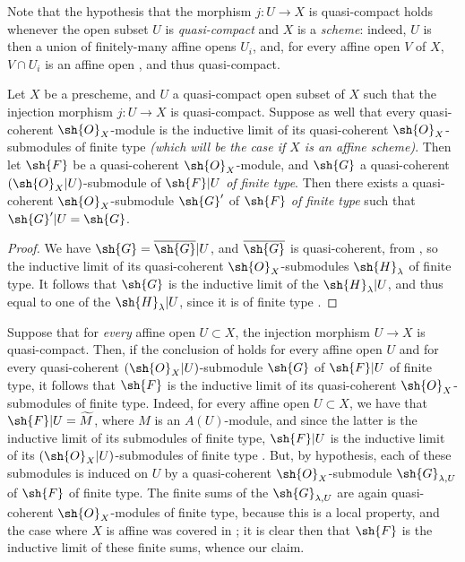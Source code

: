 Note that the hypothesis that the morphism $j:U\to X$ is quasi-compact
holds whenever the open subset $U$ is \emph{quasi-compact} and $X$ is a
\emph{scheme}: indeed, $U$ is then a union of finitely-many affine opens $U_i$,
and, for every affine open $V$ of $X$, $V\cap U_i$ is an affine open , and
thus quasi-compact.

\begin{corollary}[9.4.3]
\label{I.9.4.3}
Let $X$ be a prescheme, and $U$ a quasi-compact open subset of $X$ such that the injection
morphism $j:U\to X$ is quasi-compact. Suppose as well that every quasi-coherent
$\sh{O}_X$-module is the inductive limit of its quasi-coherent $\sh{O}_X$-submodules of finite type
\emph{(which will be the case if $X$ is an \emph{affine scheme})}. Then let $\sh{F}$ be a
quasi-coherent $\sh{O}_X$-module, and $\sh{G}$ a quasi-coherent $(\sh{O}_X|U)$-submodule of $\sh{F}|U$ \emph{of finite type}. Then there exists a quasi-coherent $\sh{O}_X$-submodule $\sh{G}'$ of
$\sh{F}$ \emph{of finite type} such that $\sh{G}'|U=\sh{G}$.
\end{corollary}

\begin{proof}
We have $\sh{G}=\overline{\sh{G}}|U$, and $\overline{\sh{G}}$ is quasi-coherent, from
, so the inductive limit of its quasi-coherent $\sh{O}_X$-submodules
$\sh{H}_\lambda$ of finite type. It follows that $\sh{G}$ is the inductive limit of the
$\sh{H}_\lambda|U$, and thus equal to one of the $\sh{H}_\lambda|U$, since it is of finite
type .
\end{proof}

\begin{remark}[9.4.4]
\label{I.9.4.4}
Suppose that for \emph{every} affine open $U\subset X$, the injection morphism $U\to X$ is
quasi-compact. Then, if the conclusion of  holds for every affine open $U$
and for every quasi-coherent $(\sh{O}_X|U)$-submodule $\sh{G}$ of $\sh{F}|U$ of finite type, it
follows
that $\sh{F}$ is the inductive limit of its quasi-coherent $\sh{O}_X$-submodules of finite type.
Indeed, for every affine open $U\subset X$, we have that $\sh{F}|U=\widetilde{M}$, where $M$
 is an $A(U)$-module, and since the latter is the inductive limit of its
submodules of finite type, $\sh{F}|U$ is the inductive limit of its $(\sh{O}_X|U)$-submodules of
finite type . But, by hypothesis, each of these submodules is induced on $U$
by a quasi-coherent $\sh{O}_X$-submodule $\sh{G}_{\lambda,U}$ of $\sh{F}$ of finite type. The
finite sums of the $\sh{G}_{\lambda,U}$ are again quasi-coherent $\sh{O}_X$-modules of finite
type, because this is a local property, and the case where $X$ is affine was covered in
; it is clear then that $\sh{F}$ is the inductive limit of these finite
sums, whence our claim.
\end{remark}

